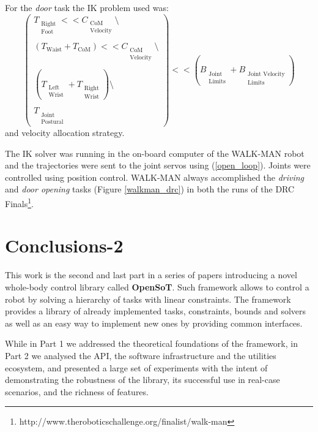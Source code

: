 For the \emph{door} task the IK problem used was:
\begin{equation}
\begin{pmatrix}
T_{\substack{\text{Right}\\\text{Foot}}} << C_{\substack{\text{CoM}\\\text{Velocity}}}\setminus\\ 
\\
\left(T_\text{Waist} + T_\text{CoM}\right)  << C_{\substack{\text{CoM}\\\text{Velocity}}}\setminus\\ 
\\
\left(T_{\substack{\text{Left}\\\text{Wrist}}} + T_{\substack{\text{Right}\\\text{Wrist}}}\right)\setminus\\
\\
T_{\substack{\text{Joint}\\\text{Postural}}}
\end{pmatrix}
<< \left(B_{\substack{\text{Joint}\\\text{Limits}}} + B_{\substack{\text{Joint Velocity}\\\text{Limits}}}\right)
\end{equation}
and velocity allocation strategy.

The IK solver was running in the on-board computer of the WALK-MAN robot and the trajectories were sent to the joint servos using (\ref{open_loop}). Joints were controlled using position control.  WALK-MAN always accomplished the \emph{driving} and \emph{door opening} tasks (Figure \ref{walkman_drc}) in both the runs of the DRC Finals\footnote{http://www.theroboticschallenge.org/finalist/walk-man}.


\section{Conclusions-2}
\label{sec:conclusions2}
This work is the second and last part in a series of papers introducing a novel whole-body control library called \textbf{OpenSoT}. Such framework allows to control a robot by solving a hierarchy of tasks with linear constraints. 
The framework provides a library of already implemented tasks, constraints, bounds and solvers as well as an easy way to implement new ones by providing common interfaces.

While in Part 1 we addressed the theoretical foundations of the framework, in Part 2 we analysed the API, the software infrastructure and the utilities ecosystem, and presented a large set of experiments with the intent of demonstrating the robustness of the library, its successful use in real-case scenarios, and the richness of features.

